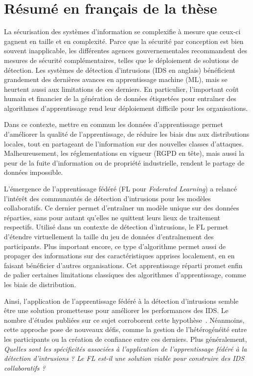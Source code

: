 \section{Résumé en français de la thèse\label{sec:french}}

La sécurisation des systèmes d'information se complexifie à mesure que ceux-ci gagnent en taille et en complexité. 
Parce que la sécurité par conception est bien souvent inapplicable, les différentes agences gouvernementales recommandent des mesures de sécurité complémentaires, telles que le déploiement de solutions de détection.
Les systèmes de détection d'intrusions (IDS en anglais) bénéficient grandement des dernières avances en apprentissage machine (ML), mais se heurtent aussi aux limitations de ces derniers.
En particulier, l'important coût humain et financier de la génération de données étiquetées pour entraîner des algorithmes d'apprentissage rend leur déploiement difficile pour les organisations.

Dans ce contexte, mettre en commun les données d'apprentissage permet d'améliorer la qualité de l'apprentissage, de réduire les biais dus aux distributions locales, tout en partageant de l'information sur des nouvelles classes d'attaques.
Malheureusement, les réglementations en vigueur (RGPD en tête), mais aussi la peur de la fuite d'information ou de propriété industrielle, rendent le partage de données impossible.

L'émergence de l'apprentissage fédéré (FL pour \emph{Federated Learning}) a relancé l'intérêt des communautés de détection d'intrusions pour les modèles collaboratifs.
Ce dernier permet d'entraîner un modèle unique sur des données réparties, sans pour autant qu'elles ne quittent leurs lieux de traitement respectifs.
Utilisé dans un contexte de détection d'intrusions, le FL permet d'étendre virtuellement la taille du jeu de données d'entraînement des participants.
Plus important encore, ce type d'algorithme permet aussi de propager des informations sur des caractéristiques apprises localement, en en faisant bénéficier d'autres organisations.
Cet apprentissage réparti promet enfin de palier certaines limitations classiques des algorithmes d'apprentissage, comme les biais de distribution.

Ainsi, l'application de l'apprentissage fédéré à la détection d'intrusions semble être une solution prometteuse pour améliorer les performances des IDS. Le nombre d'études publiées sur ce sujet corroborent cette hypothèse~\cite{lavaur_tnsm_2022,ismaila_ReviewApproachesFederated_2024}.
Néanmoins, cette approche pose de nouveaux défis, comme la gestion de l'hétérogénéité entre les participants ou la création de confiance entre ces derniers.
Plus généralement, \emph{Quelles sont les spécificités associées à l'application de l'apprentissage fédéré à la détection d'intrusions ? Le FL est-il une solution viable pour construire des IDS collaboratifs ?}


